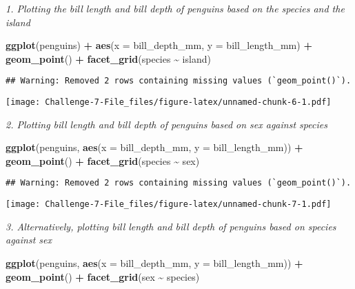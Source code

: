 \documentclass[
]{article}
\newenvironment{Shaded}{\begin{snugshade}}{\end{snugshade}}
\newcommand{\AttributeTok}[1]{\textcolor[rgb]{0.13,0.29,0.53}{#1}}
\newcommand{\FunctionTok}[1]{\textcolor[rgb]{0.13,0.29,0.53}{\textbf{#1}}}
\newcommand{\NormalTok}[1]{#1}
\newcommand{\SpecialCharTok}[1]{\textcolor[rgb]{0.81,0.36,0.00}{\textbf{#1}}}
\begin{document}
\emph{1. Plotting the bill length and bill depth of penguins based on
the species and the island}

\begin{Shaded}
\begin{Highlighting}[]
\FunctionTok{ggplot}\NormalTok{(penguins) }\SpecialCharTok{+}
\FunctionTok{aes}\NormalTok{(}\AttributeTok{x =}\NormalTok{ bill\_depth\_mm,}
\AttributeTok{y =}\NormalTok{ bill\_length\_mm) }\SpecialCharTok{+}
\FunctionTok{geom\_point}\NormalTok{() }\SpecialCharTok{+}
\FunctionTok{facet\_grid}\NormalTok{(species }\SpecialCharTok{\textasciitilde{}}\NormalTok{ island)}
\end{Highlighting}
\end{Shaded}

\begin{verbatim}
## Warning: Removed 2 rows containing missing values (`geom_point()`).
\end{verbatim}

\texttt{[image: Challenge-7-File\_files/figure-latex/unnamed-chunk-6-1.pdf]}

\emph{2. Plotting bill length and bill depth of penguins based on sex
against species}

\begin{Shaded}
\begin{Highlighting}[]
\FunctionTok{ggplot}\NormalTok{(penguins, }\FunctionTok{aes}\NormalTok{(}\AttributeTok{x =}\NormalTok{ bill\_depth\_mm, }\AttributeTok{y =}\NormalTok{ bill\_length\_mm)) }\SpecialCharTok{+} \FunctionTok{geom\_point}\NormalTok{() }\SpecialCharTok{+}
\FunctionTok{facet\_grid}\NormalTok{(species }\SpecialCharTok{\textasciitilde{}}\NormalTok{ sex)}
\end{Highlighting}
\end{Shaded}

\begin{verbatim}
## Warning: Removed 2 rows containing missing values (`geom_point()`).
\end{verbatim}

\texttt{[image: Challenge-7-File\_files/figure-latex/unnamed-chunk-7-1.pdf]}

\emph{3. Alternatively, plotting bill length and bill depth of penguins
based on species against sex}

\begin{Shaded}
\begin{Highlighting}[]
\FunctionTok{ggplot}\NormalTok{(penguins, }\FunctionTok{aes}\NormalTok{(}\AttributeTok{x =}\NormalTok{ bill\_depth\_mm, }\AttributeTok{y =}\NormalTok{ bill\_length\_mm)) }\SpecialCharTok{+} \FunctionTok{geom\_point}\NormalTok{() }\SpecialCharTok{+}
\FunctionTok{facet\_grid}\NormalTok{(sex }\SpecialCharTok{\textasciitilde{}}\NormalTok{ species)}
\end{Highlighting}
\end{Shaded}
\end{document}
